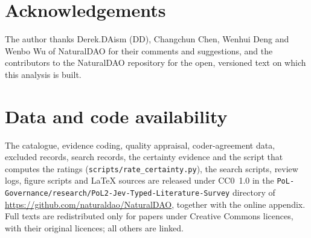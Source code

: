 \section*{Acknowledgements}
The author thanks Derek.DAism (DD), Changchun Chen, Wenhui Deng and Wenbo Wu of NaturalDAO for their comments and suggestions, and the contributors to the NaturalDAO repository for the open, versioned \pol{} text on which this analysis is built.

\section*{Data and code availability}
The catalogue, evidence coding, quality appraisal, coder-agreement data, excluded records, search records, the certainty evidence and the script that computes the ratings (\nolinkurl{scripts/rate_certainty.py}), the search scripts, review logs, figure scripts and LaTeX sources are released under CC0~1.0 in the \nolinkurl{PoL-Governance/research/PoL2-Jev-Typed-Literature-Survey} directory of \url{https://github.com/naturaldao/NaturalDAO}, together with the online appendix.
Full texts are redistributed only for papers under Creative Commons licences, with their original licences; all others are linked.
